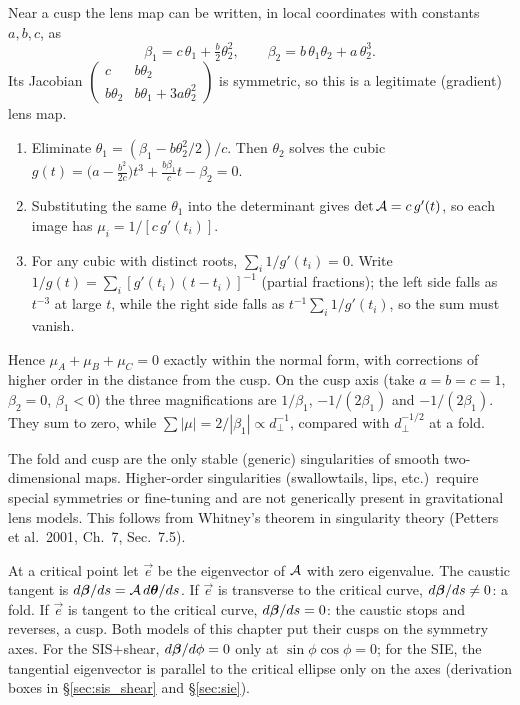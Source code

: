 \begin{derivation}
Near a cusp the lens map can be written, in local coordinates with constants
$a, b, c$, as
\[
  \beta_1 = c\,\theta_1 + \tfrac{b}{2}\theta_2^2, \qquad
  \beta_2 = b\,\theta_1\theta_2 + a\,\theta_2^3 .
\]
Its Jacobian $\begin{pmatrix} c & b\theta_2\\ b\theta_2 & b\theta_1 + 3a\theta_2^2\end{pmatrix}$
is symmetric, so this is a legitimate (gradient) lens map.
\begin{enumerate}[nosep]
  \item Eliminate $\theta_1 = (\beta_1 - b\theta_2^2/2)/c$.  Then $\theta_2$
        solves the cubic
        $g(t) = \big(a - \tfrac{b^2}{2c}\big)t^3 + \tfrac{b\beta_1}{c}t - \beta_2 = 0$.
  \item Substituting the same $\theta_1$ into the determinant gives
        $\det\mathcal{A} = c\,g'(t)$, so each image has $\mu_i = 1/[c\,g'(t_i)]$.
  \item For any cubic with distinct roots, $\sum_i 1/g'(t_i) = 0$.  Write
        $1/g(t) = \sum_i [g'(t_i)(t-t_i)]^{-1}$ (partial fractions); the left
        side falls as $t^{-3}$ at large $t$, while the right side falls as
        $t^{-1}\sum_i 1/g'(t_i)$, so the sum must vanish.
\end{enumerate}
Hence $\mu_A + \mu_B + \mu_C = 0$ exactly within the normal form, with
corrections of higher order in the distance from the cusp.  On the cusp axis
(take $a = b = c = 1$, $\beta_2 = 0$, $\beta_1 < 0$) the three magnifications
are $1/\beta_1$, $-1/(2\beta_1)$ and $-1/(2\beta_1)$.  They sum to zero, while
$\sum|\mu| = 2/|\beta_1| \propto d_\perp^{-1}$, compared with $d_\perp^{-1/2}$
at a fold.
\end{derivation}


\begin{remark}
The fold and cusp are the only stable (generic)
singularities of smooth two-dimensional maps.  Higher-order
singularities (swallowtails, lips, etc.)\ require special symmetries
or fine-tuning and are not generically present in gravitational lens
models.  This follows from Whitney's theorem in singularity
theory (Petters et al.\ 2001, Ch.~7, Sec.~7.5).
\end{remark}

\begin{annotation}
At a critical point let $\vec{e}$ be the eigenvector of $\mathcal{A}$ with zero
eigenvalue.  The caustic tangent is $d\boldsymbol{\beta}/ds = \mathcal{A}\,d\boldsymbol{\theta}/ds$.  If
$\vec{e}$ is transverse to the critical curve, $d\boldsymbol{\beta}/ds \neq 0$: a fold.
If $\vec{e}$ is tangent to the critical curve, $d\boldsymbol{\beta}/ds = 0$: the caustic
stops and reverses, a cusp.  Both models of this chapter put their cusps on
the symmetry axes.  For the SIS$+$shear, $d\boldsymbol{\beta}/d\phi = 0$ only at
$\sin\phi\cos\phi = 0$; for the SIE, the tangential eigenvector is parallel to
the critical ellipse only on the axes (derivation boxes in \S\ref{sec:sis_shear}
and \S\ref{sec:sie}).
\end{annotation}


